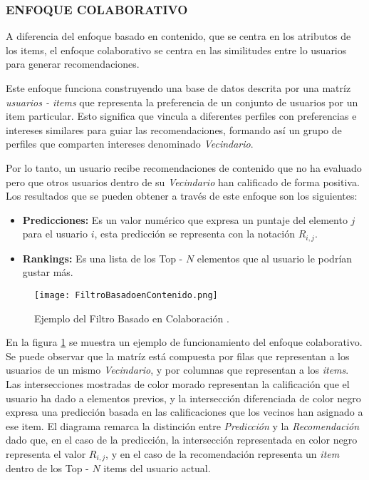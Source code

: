 \subsubsection[COLABORATIVO]{ENFOQUE COLABORATIVO}

A diferencia del enfoque basado en contenido, que se centra en los atributos de los items, el enfoque colaborativo se centra en las similitudes entre lo usuarios para generar recomendaciones.

Este enfoque funciona construyendo una base de datos descrita por una matríz \textit{usuarios - items} que representa la preferencia de un conjunto de usuarios por un item particular. Esto significa que vincula a diferentes perfiles con preferencias e intereses similares para guiar las recomendaciones, formando así un grupo  de perfiles que comparten intereses denominado \textit{Vecindario}. 


Por lo tanto, un usuario recibe recomendaciones de contenido que no ha evaluado pero que otros usuarios dentro de su \textit{Vecindario} han calificado de forma positiva. Los resultados que se pueden obtener a través de este enfoque son los siguientes:

\begin{itemize}
    \item \textbf{Predicciones: } Es un valor numérico que expresa un puntaje del elemento $j$ para el usuario $i$, esta predicción se representa con la notación $R_{i,j}$.
    \item \textbf{Rankings: } Es una lista de los Top - $N$ elementos que al usuario le podrían gustar más.
\end{itemize}

\begin{figure}[h!]
    \centering
    \texttt{[image: FiltroBasadoenContenido.png]}
    \caption{Ejemplo del Filtro Basado en Colaboración \parencite{ISINKAYE2015261}.}
    \label{fig:FiltroColaborativo}
\end{figure}

En la figura \ref{fig:FiltroColaborativo} se muestra un ejemplo de funcionamiento del enfoque colaborativo. Se puede observar que la matríz está compuesta por filas que representan a los usuarios de un mismo \textit{Vecindario}, y por columnas que representan a los \textit{items}. Las intersecciones mostradas de color morado representan la calificación que el usuario ha dado a elementos previos, y la intersección diferenciada de color negro expresa una predicción basada en las calificaciones que los vecinos han asignado a ese item.
El diagrama remarca la distinción entre \textit{Predicción} y la \textit{Recomendación} dado que, en el caso de la predicción,  la intersección representada en color negro representa el valor $R_{i,j}$, y en el caso de la recomendación representa un \textit{item} dentro de los Top - $N$ items del usuario actual.

